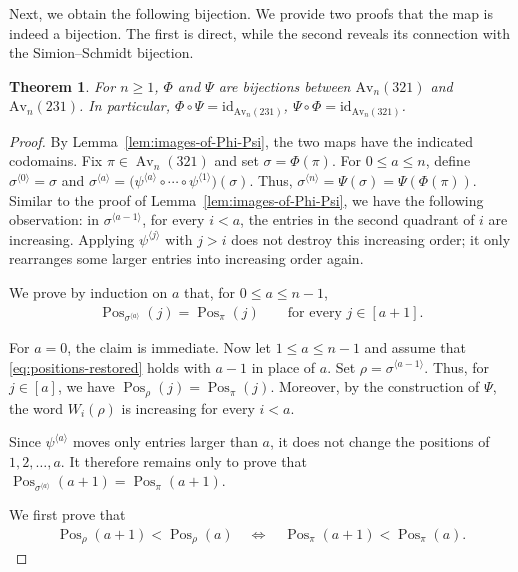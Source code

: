 \documentclass[11pt]{article}
\newtheorem{thm}{Theorem}[section]
\begin{document}
Next, we obtain the following bijection. We provide two proofs that the map is indeed a bijection. The first is direct, while the second reveals its connection with the Simion--Schmidt bijection.

\begin{thm}\label{thm:Phi-Psi-bijection}
For $n\geq 1$, $\Phi$ and $\Psi$ are bijections between $\text{Av}_n(321)$ and $\text{Av}_n(231)$. In particular,
$\Phi\circ\Psi=\text{id}_{\text{Av}_n(231)}$, $\Psi\circ\Phi=\text{id}_{\text{Av}_n(321)}$.
\end{thm}
\begin{proof}
By Lemma~\ref{lem:images-of-Phi-Psi}, the two maps have the indicated codomains.
Fix $\pi\in\operatorname{Av}_n(321)$ and set $\sigma=\Phi(\pi)$.
For $0\leq a\leq n$, define $\sigma^{\langle0\rangle}=\sigma$
and $\sigma^{\langle a\rangle}
=
\bigl(
\psi^{\langle a\rangle}\circ\cdots\circ
\psi^{\langle1\rangle}
\bigr)(\sigma)$.
Thus, $\sigma^{\langle n\rangle}
=
\Psi(\sigma)
=
\Psi(\Phi(\pi))$.
Similar to the proof of Lemma~\ref{lem:images-of-Phi-Psi}, we have the following observation: in $\sigma^{\langle a-1\rangle}$, for every $i<a$, the entries in the second quadrant of $i$ are increasing. Applying $\psi^{\langle j\rangle}$ with $j>i$ does not destroy this increasing order; it only rearranges some larger entries into increasing order again.

We prove by induction on $a$ that, for $0\leq a\leq n-1$,
\begin{align}\label{eq:positions-restored}
\operatorname{Pos}_{\sigma^{\langle a\rangle}}(j)
=
\operatorname{Pos}_{\pi}(j)
\qquad
\text{for every }j\in[a+1].
\end{align}

For $a=0$, the claim is immediate.
Now let $1\leq a\leq n-1$ and assume that \eqref{eq:positions-restored} holds with $a-1$ in place of $a$.
Set $\rho=\sigma^{\langle a-1\rangle}$.
Thus, for $j\in[a]$, we have
$\operatorname{Pos}_{\rho}(j)
=
\operatorname{Pos}_{\pi}(j)$.
Moreover, by the construction of $\Psi$, the word $W_i(\rho)$ is
increasing for every $i<a$.

Since $\psi^{\langle a\rangle}$ moves only entries larger than $a$,
it does not change the positions of $1,2,\ldots,a$. It therefore
remains only to prove that $\operatorname{Pos}_{\sigma^{\langle a\rangle}}(a+1)
=
\operatorname{Pos}_{\pi}(a+1)$.


We first prove that
\begin{align}\label{eq:same-side}
\operatorname{Pos}_{\rho}(a+1)<\operatorname{Pos}_{\rho}(a)
\quad\Longleftrightarrow\quad
\operatorname{Pos}_{\pi}(a+1)<\operatorname{Pos}_{\pi}(a).
\end{align}


\end{proof}
\end{document}
